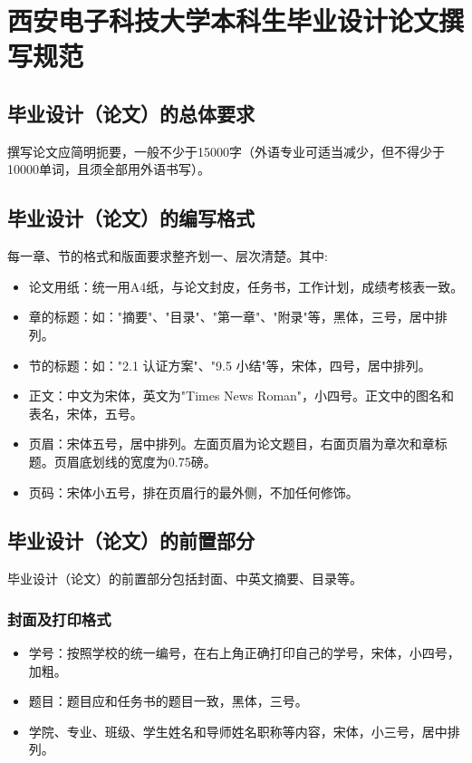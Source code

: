 
\chapter[本科生毕业设计论文撰写规范]{西安电子科技大学本科生毕业设计论文撰写规范}
\label{chap:requires}
\section{毕业设计（论文）的总体要求}
撰写论文应简明扼要，一般不少于15000字（外语专业可适当减少，但不得少于10000单词，且须全部用外语书写）。

\section{毕业设计（论文）的编写格式}
每一章、节的格式和版面要求整齐划一、层次清楚。其中:
\begin{itemize}
  \item 论文用纸：统一用A4纸，与论文封皮，任务书，工作计划，成绩考核表一致。
  \item 章的标题：如："摘要"、"目录"、"第一章"、"附录"等，黑体，三号，居中排列。
  \item 节的标题：如："2.1  认证方案"、"9.5  小结"等，宋体，四号，居中排列。
  \item 正文：中文为宋体，英文为"Times News Roman"，小四号。正文中的图名和表名，宋体，五号。
  \item 页眉：宋体五号，居中排列。左面页眉为论文题目，右面页眉为章次和章标题。页眉底划线的宽度为0.75磅。
  \item 页码：宋体小五号，排在页眉行的最外侧，不加任何修饰。
\end{itemize}

\section{毕业设计（论文）的前置部分}
毕业设计（论文）的前置部分包括封面、中英文摘要、目录等。
\subsection{封面及打印格式}
\begin{itemize}
  \item 学号：按照学校的统一编号，在右上角正确打印自己的学号，宋体，小四号，加粗。
  \item 题目：题目应和任务书的题目一致，黑体，三号。
  \item 学院、专业、班级、学生姓名和导师姓名职称等内容，宋体，小三号，居中排列。
\end{itemize}

